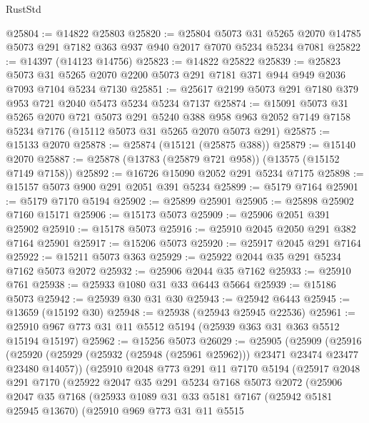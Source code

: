 \begin{lexlean}{RustStd}
\begin{coremodule}
@25804 := @14822 @25803
@25820 := @25804
    @5073
    @31
    @5265
    @2070
    @14785
    @5073
    @291
    @7182
    @363
    @937
    @940
    @2017
    @7070
    @5234
    @5234
    @7081
@25822 := @14397 (@14123 @14756)
@25823 := @14822 @25822
@25839 := @25823
    @5073
    @31
    @5265
    @2070
    @2200
    @5073
    @291
    @7181
    @371
    @944
    @949
    @2036
    @7093
    @7104
    @5234
    @7130
@25851 := @25617 @2199 @5073 @291 @7180 @379 @953 @721 @2040 @5473 @5234 @5234 @7137
@25874 := @15091
    @5073
    @31
    @5265
    @2070
    @721
    @5073
    @291
    @5240
    @388
    @958
    @963
    @2052
    @7149
    @7158
    @5234
    @7176
    (@15112 @5073 @31 @5265 @2070 @5073 @291)
@25875 := @15133 @2070
@25878 := @25874 (@15121 (@25875 @388))
@25879 := @15140 @2070
@25887 := @25878 (@13783 (@25879 @721 @958)) (@13575 (@15152 @7149 @7158))
@25892 := @16726 @15090 @2052 @291 @5234 @7175
@25898 := @15157 @5073 @900 @291 @2051 @391 @5234
@25899 := @5179 @7164
@25901 := @5179 @7170 @5194
@25902 := @25899 @25901
@25905 := @25898 @25902 @7160 @15171
@25906 := @15173 @5073
@25909 := @25906 @2051 @391 @25902
@25910 := @15178 @5073
@25916 := @25910 @2045 @2050 @291 @382 @7164 @25901
@25917 := @15206 @5073
@25920 := @25917 @2045 @291 @7164
@25922 := @15211 @5073 @363
@25929 := @25922 @2044 @35 @291 @5234 @7162 @5073 @2072
@25932 := @25906 @2044 @35 @7162
@25933 := @25910 @761
@25938 := @25933 @1080 @31 @33 @6443 @5664
@25939 := @15186 @5073
@25942 := @25939 @30 @31 @30
@25943 := @25942 @6443
@25945 := @13659 (@15192 @30)
@25948 := @25938 (@25943 @25945 @22536)
@25961 := @25910 @967 @773 @31 @11 @5512 @5194 (@25939 @363 @31 @363 @5512 @15194 @15197)
@25962 := @15256 @5073
@26029 := @25905
    (@25909
      (@25916
        (@25920 (@25929 (@25932 (@25948 (@25961 @25962))) @23471 @23474 @23477 @23480 @14057))
        (@25910
          @2048
          @773
          @291
          @11
          @7170
          @5194
          (@25917
            @2048
            @291
            @7170
            (@25922
              @2047
              @35
              @291
              @5234
              @7168
              @5073
              @2072
              (@25906
                @2047
                @35
                @7168
                (@25933
                  @1089
                  @31
                  @33
                  @5181
                  @7167
                  (@25942 @5181 @25945 @13670)
                  (@25910
                    @969
                    @773
                    @31
                    @11
                    @5515

\end{coremodule}
\end{lexlean}
